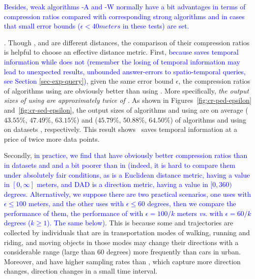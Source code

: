 \textcolor{blue}{Besides, weak algorithms \operb-A and \cised-W normally have a bit advantages in terms of compression ratios compared with corresponding strong algorithms \operb and \cised in cases that small error bounds (\eg $\epsilon<40 meters$ in these tests) are set.}




.
Though \ped, \sed and \dad are different distances, the comparison of their compression ratios is helpful to choose an effective distance metric.
%
First, \textcolor{blue}{because \sed saves temporal information while \ped does not (remember the losing of temporal information may lead to unexpected results, \eg unbounded answer-errors to spatio-temporal queries, see Section \ref{sec-exp-query})}, given the same error bound $\epsilon$, the compression ratios of algorithms using \ped are obviously better
than using \sed. More specifically, \emph{the output sizes of using \sed are approximately twice of \ped.}
%
As shown in Figures~\ref{fig:cr-ped-epsilon} and~\ref{fig:cr-sed-epsilon}, the output sizes of algorithms \tpa and \dpa
using \ped are on average ($43.55\%$, $47.49\%$, $63.15\%$) and ($45.79\%$,
$50.88\%$, $64.50\%$) of algorithms \tpa and \dpa using \sed on datasets \dSets, respectively.
%
%
This result shows ~\sed saves temporal information at a price of twice more data points.


Secondly, \textcolor{blue}{in practice, we find that \sed have obviously better compression ratios than \dad in datasets \geolife and \mopsi and a bit poorer than \dad in \ucar (indeed, it is hard to compare them under absolutely fair conditions, as \sed is a Euclidean distance metric, having a value in $[0, \infty]$ meters, and DAD is a direction metric,  having a value in $[0,360)$ degrees. Alternatively, we suppose there are two practical scenarios, one uses \sed with $\epsilon  \le  100$ meters, and the other uses \dad with $\epsilon \le 60$ degrees, then we compare the performance of them, \eg the performance of \sed with $\epsilon=100/k$ meters \emph{vs.} \dad with $\epsilon=60/k$ degrees ($k \ge 1$). The same below).}
This is because some \geolife and \mopsi trajectories are collected by individuals that are in transportation modes of walking, running and riding, and moving objects in those modes may change their directions with a considerable range (\eg large than $60$ degrees) more frequently than cars in urban. Moreover, \geolife and \mopsi have higher sampling rates than \ucar, which capture more direction changes, \ie direction changes in a small time interval.

